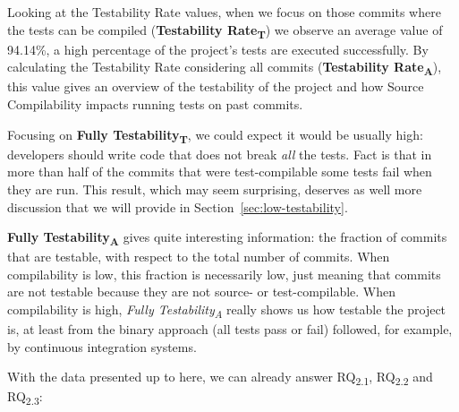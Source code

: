 Looking at the Testability Rate values, when we focus on those commits where the tests can be compiled (\textbf{Testability Rate\textsubscript{T}}) we observe an average value of 94.14\%, a high percentage of the project's tests are executed successfully. 
By calculating the Testability Rate considering all commits (\textbf{Testability Rate\textsubscript{A}}), this value gives an overview of the testability of the project and how Source Compilability impacts running tests on past commits.

Focusing on \textbf{Fully Testability\textsubscript{T}}, we could expect it would be usually high: developers should write code that does not break \textit{all} the tests. 
Fact is that in more than half of the commits that were test-compilable some tests fail when they are run. 
This result, which may seem surprising, deserves as well more discussion that we will provide in Section~\ref{sec:low-testability}.

\textbf{Fully Testability\textsubscript{A}} gives quite interesting information: the fraction of commits that are testable, with respect to the total number of commits. 
When compilability is low, this fraction is necessarily low, just meaning that commits are not testable because they are not source- or test-compilable. 
When compilability is high, \textit{Fully Testability\textsubscript{A}} really shows us how testable the project is, at least from the binary approach (all tests pass or fail) followed, for example, by continuous integration systems.

With the data presented up to here, we can already answer RQ\textsubscript{2.1}, RQ\textsubscript{2.2} and RQ\textsubscript{2.3}:

\vspace{0.5cm}

